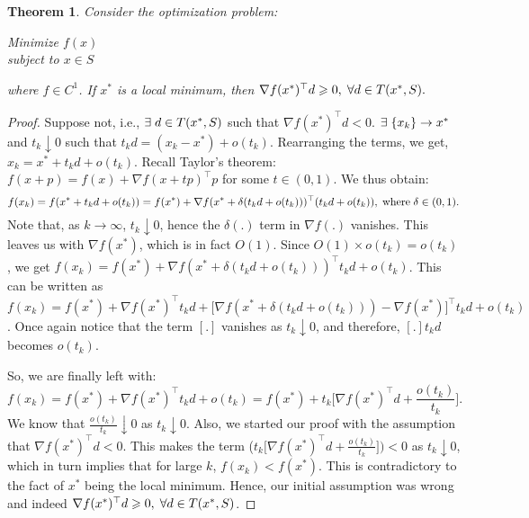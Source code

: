 \documentclass[twoside]{article}
\newcounter{lecnum}
\newtheorem{theorem}{Theorem}[lecnum]
\begin{document}
\begin{theorem}
Consider the optimization problem:
\begin{center}
    Minimize $f(x)$\\
    subject to $x\in S$ 
\end{center}
where $f \in C^{1}$. If $x^{*}$ is a local minimum, then $\nabla f(x^{*})^{\top}d \geqslant 0, \hspace{1mm}\forall d \in T(x^{*},S).$
\end{theorem}
\begin{proof}
Suppose not, i.e., $\exists \hspace{1mm} d \in T(x^{*},S)$ such that $\nabla f(x^{*})^{\top}d < 0$. $\exists \hspace{1mm} \{x_{k}\} \rightarrow x^{*}$ and $t_{k} \downarrow 0$ such that $t_{k}d = (x_{k} - x^{*}) + o(t_{k})$. Rearranging the terms, we get, $x_{k} = x^{*} + t_{k}d + o(t_{k}) $. Recall Taylor's theorem:\\
$f(x+p) = f(x) + \nabla f(x+tp)^{\top}p$ for some $t \in (0,1)$. We thus obtain:
\begin{equation*}
f(x_{k}) = f(x^{*} +  t_{k}d + o(t_{k}))=   f(x^{*})+  \nabla f(x^{*} + \delta( t_{k}d + o(t_{k})))^{\top}(t_{k}d + o(t_{k})), \hspace{1mm} \textrm {where} \hspace{1mm} \delta \in (0,1).
\end{equation*}
Note that, as $k \rightarrow \infty$, $t_{k} \downarrow 0$, hence the $\delta(.)$ term in $\nabla f(.)$ vanishes. This leaves us with $\nabla f(x^{*})$, which is in fact $O(1)$. Since $O(1) \times o(t_{k}) = o(t_{k})$, we get
 $f(x_{k}) = f(x^{*})+  \nabla f(x^{*} + \delta( t_{k}d + o(t_{k})))^{\top}t_{k}d + o(t_{k}) $. This can be written as 
 $f(x_{k}) = f(x^{*}) + \nabla f(x^{*})^{\top}t_{k}d + \Big[\nabla f(x^{*} + \delta( t_{k}d + o(t_{k}))) - \nabla f(x^{*}) \Big]^{\top}t_{k}d + o(t_{k})$. Once again notice that the term $[.]$ vanishes as $t_{k} \downarrow 0$, and therefore, $[.] t_{k}d$ becomes $o(t_{k})$.\par
 So, we are finally left with:
 \begin{equation*}
 f(x_{k}) = f(x^{*}) + \nabla f(x^{*})^{\top}t_{k}d + o(t_{k}) = f(x^{*}) + t_{k}\bigg[\nabla f(x^{*})^{\top}d + \frac{o(t_{k})}{t_{k}}\bigg].     
 \end{equation*}
We know that $ \frac{o(t_{k})}{t_{k}}\downarrow 0$ as $t_{k} \downarrow 0$. Also, we started our proof with the assumption that $\nabla f(x^{*})^{\top}d < 0$. This makes the term \bigg($t_{k}\bigg[\nabla f(x^{*})^{\top}d + \frac{o(t_{k})}{t_{k}}\bigg]\bigg) < 0$ as $t_{k} \downarrow 0$, which in turn implies that for large $k$, $f(x_k) < f(x^*)$. This is contradictory to the fact of $x^*$ being the local minimum. Hence, our initial assumption was wrong and indeed $\nabla f(x^{*})^{\top}d \geqslant 0, \hspace{1mm}\forall d \in T(x^{*},S)$.
\end{proof}


\end{document}
